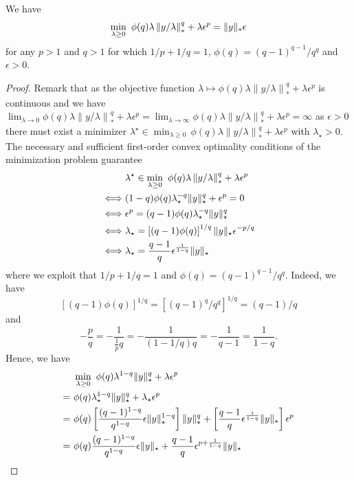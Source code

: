 \begin{lemma}
  \label{lemma:dual-helper}
  We have
  \[
    \min_{\lambda \geq 0} ~\phi(q)\lambda \left\|y/\lambda \right\|^q_* + \lambda \epsilon^p = \| y \|_*\epsilon
  \]
  for any $p>1$ and $q>1$ for which $1/p+1/q=1$, $\phi(q)=(q-1)^{q-1}/q^q$ and $\epsilon>0$.
\end{lemma}
\begin{proof}
  Remark that as the objective function $\lambda\mapsto \phi(q)\lambda \left\|y/\lambda \right\|^q_* + \lambda \epsilon^p$ is continuous and we have $\lim_{\lambda\to 0} \phi(q)\lambda \left\|y/\lambda \right\|^q_* + \lambda \epsilon^p = \lim_{\lambda\to\infty} \phi(q)\lambda \left\|y/\lambda \right\|^q_* + \lambda \epsilon^p=\infty$ as $\epsilon>0$ there must exist a minimizer $\lambda^\star\in \min_{\lambda \geq 0}\, \phi(q)\lambda \left\|y/\lambda \right\|^q_* + \lambda \epsilon^p$ with $\lambda_\star>0$.
The necessary and sufficient first-order convex optimality conditions of the minimization problem guarantee
\begin{align*}
  & \lambda^\star\in \min_{\lambda \geq 0} ~\phi(q)\lambda \left\|y/\lambda \right\|^q_* + \lambda \epsilon^p\\
  \iff & (1-q)\phi(q) \lambda_\star^{-q} \| y \|_\star^q + \epsilon^p = 0\\
  \iff & \epsilon^p = (q-1) \phi(q) \lambda_\star^{-q} \| y \|_\star^q \\
  \iff & \lambda_\star = \left[(q-1) \phi(q)\right]^{1/q} \| y \|_\star\epsilon^{-p/q}\\
  \iff & \lambda_\star = \frac{q-1}{q} \epsilon^{\frac{1}{1-q}} \| y \|_\star
\end{align*}
where we exploit that $1/p+1/q=1$ and $\phi(q)=(q-1)^{q-1}/q^q$. Indeed, we have
\[
  \left[(q-1) \phi(q)\right]^{1/q} = \left[(q-1)^{q}/q^q\right]^{1/q}= (q-1)/q
\]
and
\[
  -\frac{p}{q} = -\frac{1}{\frac{1}{p} q} = -\frac{1}{(1-1/q) q}=-\frac{1}{q-1}=\frac{1}{1-q}.
\]
Hence, we have
\begin{align*}
  & \min_{\lambda\geq 0} ~\phi(q) \lambda^{1-q} \norm{y}_\star^q+\lambda\epsilon^p\\
  = ~&\phi(q) \lambda_\star^{1-q} \norm{y}_\star^q+\lambda_\star\epsilon^p\\
  = ~&\phi(q) \left[ \frac{(q-1)^{1-q}}{q^{1-q}} \epsilon \norm{y}^{1-q}_\star \right] \norm{y}_\star^q +\left[\frac{q-1}{q} \epsilon^{\frac{1}{1-q}} \norm{y}_\star\right]\epsilon^p\\
  = ~&\phi(q) \frac{(q-1)^{1-q}}{q^{1-q}} \epsilon \norm{y}_\star +\frac{q-1}{q} \epsilon^{p+\frac{1}{1-q}} \norm{y}_\star\\

\end{align*}
\end{proof}
